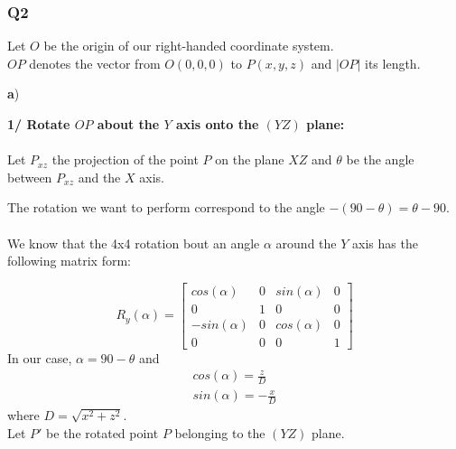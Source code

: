 \documentclass[a4paper,10pt]{article}
\begin{document}
\pagebreak

\subsubsection{Q2}
\bigskip

\noindent
Let $O$ be the origin of our right-handed coordinate system. \\
$OP$ denotes the vector from $O(0, 0, 0)$ to $P(x, y, z)$ and $|OP|$ its length.


\bigskip \noindent
\textbf{a})

\bigskip \noindent
\textbf{1/ Rotate $OP$ about the $Y$ axis onto the $(YZ)$ plane:}\\\\
Let $P_{xz}$ the projection of the point $P$ on the plane $XZ$ and $\theta$ be the angle between $P_{xz}$ and the $X$ axis.

\bigskip \noindent
The rotation we want to perform correspond to the angle $-(90 - \theta) = \theta - 90$. \\\\
We know that the 4x4 rotation bout an angle $\alpha$ around the $Y$ axis has the following matrix form:

\begin{equation}
R_y(\alpha) =
\begin{bmatrix}
	cos(\alpha)  & 0 & sin(\alpha) & 0 \\
	0 			 & 1 & 0		   & 0 \\
	-sin(\alpha) & 0 & cos(\alpha) & 0 \\
	0 			 & 0 & 0 		   & 1
\end{bmatrix}
\end{equation}
\noindent
In our case, $\alpha = 90 - \theta$ and
\begin{equation}
\left.\begin{aligned}
	&cos(\alpha) = \frac{z}{D}& \\
	&sin(\alpha) = -\frac{x}{D}&
\end{aligned}\right.
\end{equation}
where $D = \sqrt{x^2 + z^2}$.\\


\noindent
Let $P'$ be the rotated point $P$ belonging to the $(YZ)$ plane.
\end{document}
